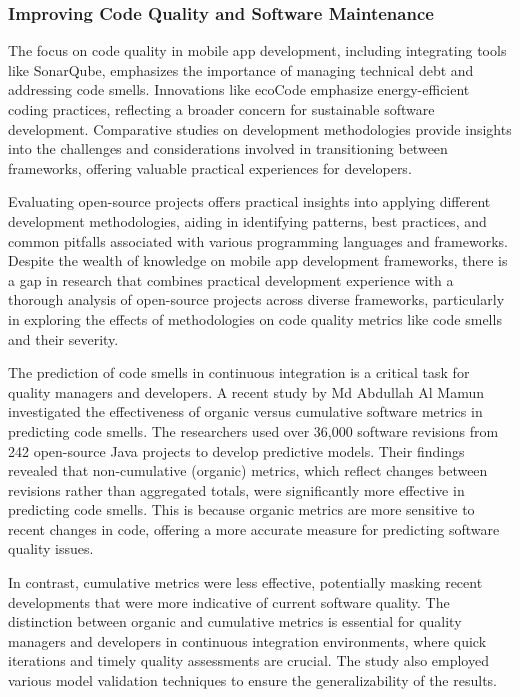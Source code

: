 \subsubsection*{Improving Code Quality and Software Maintenance}
The focus on code quality in mobile app development, including integrating tools like SonarQube, emphasizes the importance of managing technical debt and addressing code smells\cite{hecht2015detecting}. Innovations like ecoCode emphasize energy-efficient coding practices, reflecting a broader concern for sustainable software development. Comparative studies on development methodologies provide insights into the challenges and considerations involved in transitioning between frameworks, offering valuable practical experiences for developers\cite{lamothe2020a3}.
\par
Evaluating open-source projects offers practical insights into applying different development methodologies, aiding in identifying patterns, best practices, and common pitfalls associated with various programming languages and frameworks. Despite the wealth of knowledge on mobile app development frameworks, there is a gap in research that combines practical development experience with a thorough analysis of open-source projects across diverse frameworks, particularly in exploring the effects of methodologies on code quality metrics like code smells and their severity\cite{ardito2020effectiveness}.
\par
The prediction of code smells in continuous integration is a critical task for quality managers and developers. A recent study by Md Abdullah Al Mamun \cite{mamunimproving} investigated the effectiveness of organic versus cumulative software metrics in predicting code smells. The researchers used over 36,000 software revisions from 242 open-source Java projects to develop predictive models. Their findings revealed that non-cumulative (organic) metrics, which reflect changes between revisions rather than aggregated totals, were significantly more effective in predicting code smells. This is because organic metrics are more sensitive to recent changes in code, offering a more accurate measure for predicting software quality issues.
\par
In contrast, cumulative metrics were less effective, potentially masking recent developments that were more indicative of current software quality. The distinction between organic and cumulative metrics is essential for quality managers and developers in continuous integration environments, where quick iterations and timely quality assessments are crucial. The study also employed various model validation techniques to ensure the generalizability of the results.

